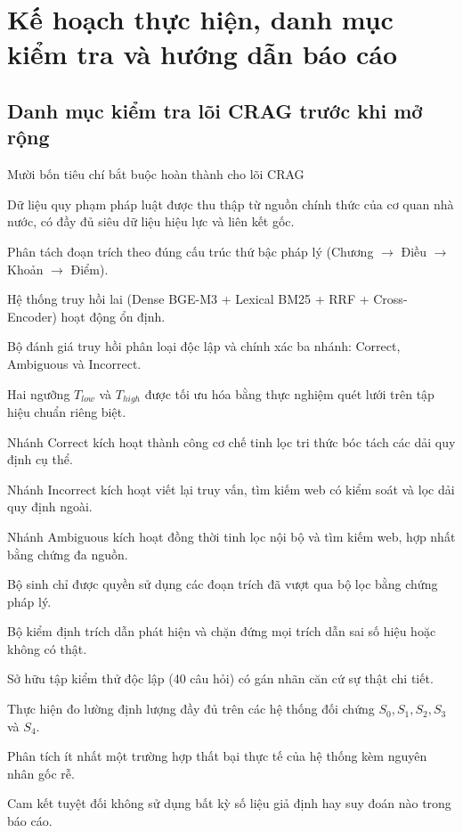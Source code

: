 \chapter{Kế hoạch thực hiện, danh mục kiểm tra và hướng dẫn báo cáo}

\section{Danh mục kiểm tra lõi CRAG trước khi mở rộng}

\begin{infobox}{Mười bốn tiêu chí bắt buộc hoàn thành cho lõi CRAG}
\begin{enumerate}[label=\textbf{[\arabic*]}]
    \item Dữ liệu quy phạm pháp luật được thu thập từ nguồn chính thức của cơ quan nhà nước, có đầy đủ siêu dữ liệu hiệu lực và liên kết gốc.
    \item Phân tách đoạn trích theo đúng cấu trúc thứ bậc pháp lý (Chương $\to$ Điều $\to$ Khoản $\to$ Điểm).
    \item Hệ thống truy hồi lai (Dense BGE-M3 + Lexical BM25 + RRF + Cross-Encoder) hoạt động ổn định.
    \item Bộ đánh giá truy hồi phân loại độc lập và chính xác ba nhánh: Correct, Ambiguous và Incorrect.
    \item Hai ngưỡng $T_{low}$ và $T_{high}$ được tối ưu hóa bằng thực nghiệm quét lưới trên tập hiệu chuẩn riêng biệt.
    \item Nhánh Correct kích hoạt thành công cơ chế tinh lọc tri thức bóc tách các dải quy định cụ thể.
    \item Nhánh Incorrect kích hoạt viết lại truy vấn, tìm kiếm web có kiểm soát và lọc dải quy định ngoài.
    \item Nhánh Ambiguous kích hoạt đồng thời tinh lọc nội bộ và tìm kiếm web, hợp nhất bằng chứng đa nguồn.
    \item Bộ sinh chỉ được quyền sử dụng các đoạn trích đã vượt qua bộ lọc bằng chứng pháp lý.
    \item Bộ kiểm định trích dẫn phát hiện và chặn đứng mọi trích dẫn sai số hiệu hoặc không có thật.
    \item Sở hữu tập kiểm thử độc lập (40 câu hỏi) có gán nhãn căn cứ sự thật chi tiết.
    \item Thực hiện đo lường định lượng đầy đủ trên các hệ thống đối chứng $S_0, S_1, S_2, S_3$ và $S_4$.
    \item Phân tích ít nhất một trường hợp thất bại thực tế của hệ thống kèm nguyên nhân gốc rễ.
    \item Cam kết tuyệt đối không sử dụng bất kỳ số liệu giả định hay suy đoán nào trong báo cáo.
\end{enumerate}
\end{infobox}

